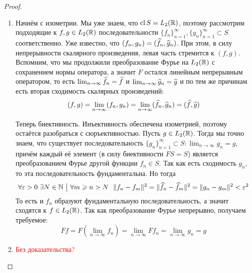 \begin{proof}~
	\begin{enumerate}
		\item Начнём с изометрии. Мы уже знаем, что $\operatorname{cl} S = L_2(\mathbb{R})$, поэтому рассмотрим подходящие к $f, g \in L_2(\mathbb{R})$ последовательности $\{f_n\}_{n = 1}^\infty, \{g_n\}_{n = 1}^\infty \subset S$ соответственно. Уже известно, что $(f_n, g_n) = (\widehat{f}_n, \widehat{g}_n)$. При этом, в силу непрерывности скалярного произведения, левая часть стремится к $(f, g)$. Вспомним, что мы продолжили преобразование Фурье на $L_2(\mathbb{R})$ с сохранением нормы оператора, а значит $F$ остался линейным непрерывным оператором, то есть $\lim_{n \to \infty} \widehat{f}_n = \widehat{f}$ и $\lim_{n \to \infty} \widehat{g}_n = \widehat{g}$ и по тем же причинам есть вторая сходимость скалярных произведений:
		\[
			(f, g) = \lim_{n \to \infty} (f_n, g_n) = \lim_{n \to \infty} (\widehat{f}_n, \widehat{g}_n) = (\widehat{f}, \widehat{g})
		\]
		
		Теперь биективность. Инъективность обеспечена изометрией, поэтому остаётся разобраться с сюръективностью. Пусть $g \in L_2(\mathbb{R})$. Тогда мы точно знаем, что существует последовательность $\{g_n\}_{n = 1}^\infty \subset S \colon \lim_{n \to \infty} g_n = g$, причём каждый её элемент (в силу биективности $FS = S$) является преобразованием Фурье другой функции $f_n \in S$. Так как есть сходимость $g_n$, то эта последовательность фундаментальна. Но тогда
		\[
			\forall \varepsilon > 0\ \exists N \in \mathbb{N} \ \big|\  \forall m \geqslant n > N\ \ \|f_n - f_m\|^2 = \|\widehat{f}_n - \widehat{f}_m\|^2 = \|g_n - g_m\|^2 < \varepsilon^2
		\]
		То есть и $f_n$ образуют фундаментальную последовательность, а значит сходятся к $f \in L_2(\mathbb{R})$. Так как преобразование Фурье непрерывно, получаем требуемое:
		\[
			Ff = F(\lim_{n \to \infty} f_n) = \lim_{n \to \infty} Ff_n = \lim_{n \to \infty} g_n = g
		\]
		
		\item \textcolor{red}{Без доказательства?}
	\end{enumerate}
\end{proof}